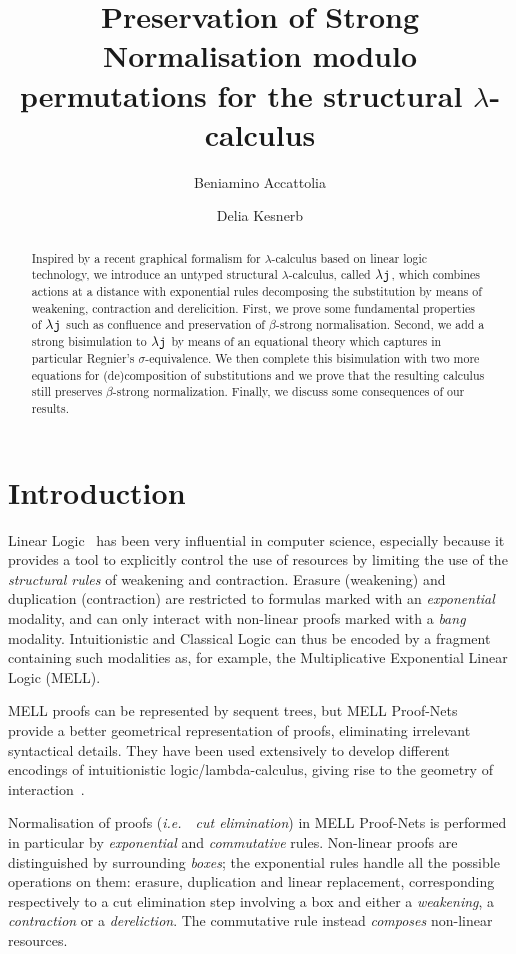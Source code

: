 \documentclass{LMCS}
\title[PSN  modulo permutations for 
the structural lambda calculus]{Preservation of Strong Normalisation modulo permutations for 
the structural $\lambda$-calculus}
\author[B.~Accattoli]{Beniamino Accattoli\rsuper a}
\author[D.~Kesner]{Delia Kesner\rsuper b}
\newcommand{\ie}{{\it  i.e.}~}
\renewcommand{\>}{\rightarrow}
\def\lam{\lambda}
\def\sig{\sigma}
\newcommand{\dis}{{\tt j}}
\newcommand{\ldis}{\lam{\dis}}
\begin{document}
\begin{abstract}
Inspired by a recent  graphical formalism for $\lam$-calculus based on
linear   logic  technology,   we  introduce   an   untyped  structural
$\lam$-calculus, called  $\ldis$, which  combines actions at  a distance
with  exponential  rules  decomposing  the substitution  by  means  of
weakening,  contraction  and   derelicition.   First,  we  prove  some
fundamental properties of $\ldis$  such as confluence and preservation
of   $\beta$-strong  normalisation.    Second,  we   add   a  strong
bisimulation  to  $\ldis$  by  means  of an  equational  theory  which
captures in particular Regnier's $\sig$-equivalence.  We then complete
this  bisimulation   with  two  more   equations  for
(de)composition  of  substitutions and  we  prove  that the  resulting
calculus  still preserves  $\beta$-strong normalization.   Finally, we
discuss some  consequences of our results.
\end{abstract}


\maketitle


\section*{Introduction}



Linear Logic~\cite{LL} has been very influential in computer science,
especially because it provides a tool to explicitly control the use of
resources by limiting the use of the \textit{structural rules} of
weakening and contraction.  Erasure (weakening) and duplication
(contraction) are restricted to formulas marked with an
\textit{exponential} modality, and can
only interact with non-linear proofs marked with a
\textit{bang} modality.  Intuitionistic
and Classical Logic can thus be encoded by a fragment containing such
modalities as, for example, the Multiplicative Exponential Linear
Logic (MELL).



MELL proofs can be represented by sequent trees, but MELL
Proof-Nets~\cite{LL} provide a better geometrical representation of
proofs, eliminating irrelevant syntactical details.  They have been
used extensively to develop different encodings of intuitionistic
logic/lambda-calculus, giving rise to the geometry of
interaction~\cite{GOI}.

Normalisation of proofs (\ie\ \textit{cut elimination}) in MELL
Proof-Nets is performed in particular by \textit{exponential} and
\textit{commutative} rules.  Non-linear proofs are distinguished by
surrounding \textit{boxes}; the exponential rules handle all the
possible operations on them: erasure, duplication and linear replacement,
corresponding respectively to a cut elimination step involving a box
and either a \textit{weakening}, a \textit{contraction} or a
\textit{dereliction}. The commutative rule instead \textit{composes}
non-linear resources.
\end{document}
